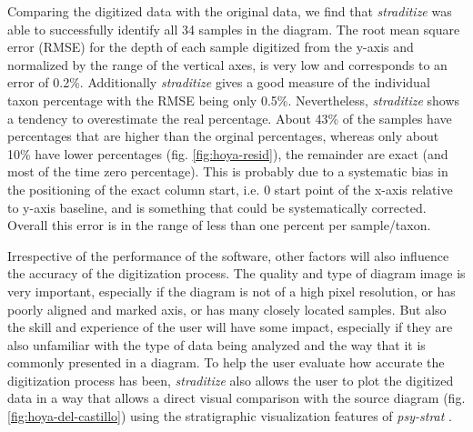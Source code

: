 \begin{refsection}
Comparing the digitized data with the original data, we find that \emph{straditize} was able to successfully identify all 34 samples in the diagram. The root mean square error (RMSE) for the depth of each sample digitized from the y-axis and normalized by the range of the vertical axes, is very low and corresponds to an error of 0.2\%. Additionally \emph{straditize} gives a good measure of the individual taxon percentage with the RMSE being only 0.5\%. Nevertheless, \emph{straditize} shows a tendency to overestimate the real percentage. About 43\% of the samples have percentages that are higher than the orginal percentages, whereas only about 10\% have lower percentages (fig. \ref{fig:hoya-resid}), the remainder are exact (and most of the time zero percentage). This is probably due to a systematic bias in the positioning of the exact column start, i.e. 0 start point of the x-axis relative to y-axis baseline, and is something that could be systematically corrected. Overall this error is in the range of less than one percent per sample/taxon.

Irrespective of the performance of the software, other factors will also influence the accuracy of the digitization process. The quality and type of diagram image is very important, especially if the diagram is not of a high pixel resolution, or has poorly aligned and marked axis, or has many closely located samples. But also the skill and experience of the user will have some impact, especially if they are also unfamiliar with the type of data being analyzed and the way that it is commonly presented in a diagram. To help the user evaluate how accurate the digitization process has been, \emph{straditize} also allows the user to plot the digitized data in a way that allows a direct visual comparison with the source diagram (fig. \ref{fig:hoya-del-castillo}) using the stratigraphic visualization features of \textit{psy-strat} \citep{Sommer2019}.


\end{refsection}
